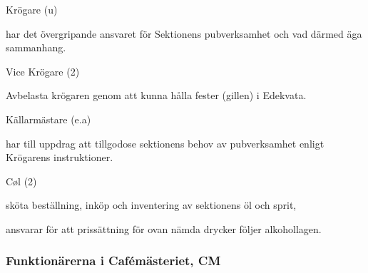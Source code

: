 \documentclass[10pt]{article}
\begin{document}
\begin{emptylist}
    \item Krögare (u)
        \begin{dashlist}
            \item har det övergripande ansvaret för Sektionens pubverksamhet
                och vad därmed äga sammanhang.
        \end{dashlist}
    \item Vice Krögare (2)
        \begin{dashlist}
        \item Avbelasta krögaren genom att kunna hålla fester (gillen) i
            Edekvata.
        \end{dashlist}
    \item Källarmästare (e.a)
        \begin{dashlist}
            \item har till uppdrag att tillgodose sektionens behov av
                pubverksamhet enligt Krögarens instruktioner.
        \end{dashlist}
    \item Cøl (2)
        \begin{dashlist}
            \item sköta beställning, inköp och inventering av sektionens öl
                och sprit,
            \item ansvarar för att prissättning för ovan nämda drycker
                följer alkohollagen.
        \end{dashlist}
\end{emptylist}
\subsubsection{Funktionärerna i Cafémästeriet, CM}
\end{document}
